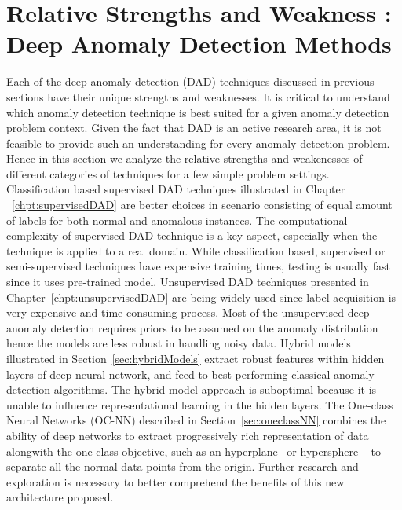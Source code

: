 \section{ Relative Strengths and Weakness : Deep Anomaly Detection Methods}
\label{sec:relativeSOW}
Each of the deep anomaly detection (DAD) techniques discussed in previous
sections have their unique strengths and weaknesses. It is critical to understand which
anomaly detection technique is best suited for a given anomaly detection problem context.
Given the fact that DAD is an active research area, it is not feasible to provide such an
understanding for every anomaly detection problem. Hence in  this section we analyze the
relative strengths and weakenesses of different categories of techniques for a few
simple problem settings.\\
Classification based supervised DAD techniques illustrated in Chapter ~\ref{chpt:supervisedDAD} are  better choices in scenario consisting of equal amount of labels for both normal and anomalous instances. The computational complexity of supervised DAD technique is a key aspect, especially when the technique is applied to a real domain. While classification
based, supervised or semi-supervised techniques have expensive training times, testing is usually fast since it uses pre-trained model. Unsupervised DAD techniques presented in Chapter~\ref{chpt:unsupervisedDAD} are being widely used since
label acquisition is very expensive and time consuming process. Most of the unsupervised deep anomaly detection requires priors to be assumed on the anomaly distribution hence the models are less robust in handling noisy data. Hybrid models illustrated in Section~\ref{sec:hybridModels} extract robust features within hidden layers of deep neural network, and feed to best performing classical anomaly detection algorithms. The hybrid model approach is suboptimal because it is unable to influence representational learning in the hidden layers.  The One-class Neural Networks  (OC-NN) described in Section~\ref{sec:oneclassNN} combines the ability of deep networks to extract progressively rich representation of data alongwith the one-class objective, such as an hyperplane~\cite{chalapathy2018anomaly} or hypersphere ~\cite{ruff2018deep} to separate all the normal data points from the origin. Further research and exploration is necessary to better comprehend the benefits of this new architecture proposed.




